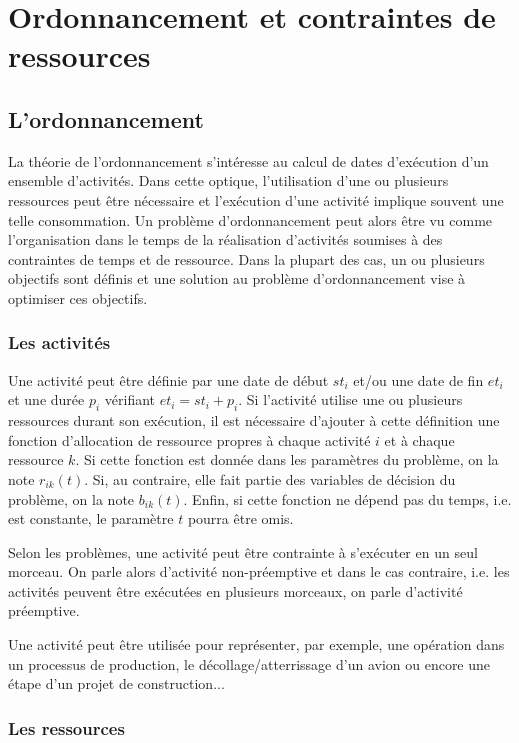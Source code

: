 \section{Ordonnancement et contraintes de ressources}
\label{sec:ordo}
\subsection{L'ordonnancement}

La théorie de l'ordonnancement s'intéresse au calcul de dates
d'exécution d'un ensemble d'activités. Dans cette optique,
l'utilisation d'une ou plusieurs ressources peut être nécessaire et
l'exécution d'une activité implique souvent une telle consommation. Un
problème d'ordonnancement peut alors être vu comme l'organisation dans
le temps de la réalisation d'activités soumises à des contraintes de
temps et de ressource. Dans la plupart des cas, un ou plusieurs
objectifs sont définis et une solution au problème d'ordonnancement 
vise à optimiser ces objectifs.
 
\subsubsection{Les activités}

Une activité peut être définie par une date de début $st_i$ et/ou une date
de fin $et_i$ et une durée $p_i$ vérifiant $et_i=st_i+p_i$. Si
l'activité utilise une ou plusieurs ressources durant son exécution, il
est nécessaire d'ajouter à cette définition une fonction d'allocation
de ressource propres à chaque activité $i$ et à chaque
ressource $k$. Si cette fonction est donnée dans les paramètres du
problème, on la note $r_{ik}(t)$. Si, au contraire, elle fait partie
des variables de décision du problème, on la note $b_{ik}(t)$. Enfin,
si cette fonction ne dépend pas du temps, i.e. est constante, le
paramètre $t$ pourra être omis. 

Selon les problèmes, une activité peut être contrainte à s'exécuter en
un seul morceau. On parle alors d'activité non-préemptive et dans le
cas contraire, i.e. les activités peuvent être exécutées en plusieurs
morceaux, on parle d'activité préemptive.

Une activité peut être utilisée pour représenter, par exemple, une
opération dans un processus de production, le décollage/atterrissage
d'un avion ou encore une étape d'un projet de construction...

\subsubsection{Les ressources}

